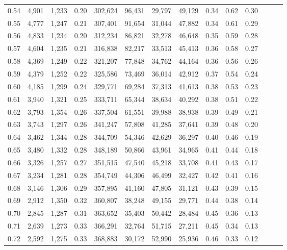 \begin{tabular}{rrrrrrrrrrrrrr}
0.54 &  4,901 &  1,233 &  0.20 &  302,624 &   96,431 &  29,797 &  49,129 &  0.34 &  0.62 &      0.30 \\
0.55 &  4,777 &  1,247 &  0.21 &  307,401 &   91,654 &  31,044 &  47,882 &  0.34 &  0.61 &      0.29 \\
0.56 &  4,833 &  1,234 &  0.20 &  312,234 &   86,821 &  32,278 &  46,648 &  0.35 &  0.59 &      0.28 \\
0.57 &  4,604 &  1,235 &  0.21 &  316,838 &   82,217 &  33,513 &  45,413 &  0.36 &  0.58 &      0.27 \\
0.58 &  4,369 &  1,249 &  0.22 &  321,207 &   77,848 &  34,762 &  44,164 &  0.36 &  0.56 &      0.26 \\
0.59 &  4,379 &  1,252 &  0.22 &  325,586 &   73,469 &  36,014 &  42,912 &  0.37 &  0.54 &      0.24 \\
0.60 &  4,185 &  1,299 &  0.24 &  329,771 &   69,284 &  37,313 &  41,613 &  0.38 &  0.53 &      0.23 \\
0.61 &  3,940 &  1,321 &  0.25 &  333,711 &   65,344 &  38,634 &  40,292 &  0.38 &  0.51 &      0.22 \\
0.62 &  3,793 &  1,354 &  0.26 &  337,504 &   61,551 &  39,988 &  38,938 &  0.39 &  0.49 &      0.21 \\
0.63 &  3,743 &  1,297 &  0.26 &  341,247 &   57,808 &  41,285 &  37,641 &  0.39 &  0.48 &      0.20 \\
0.64 &  3,462 &  1,344 &  0.28 &  344,709 &   54,346 &  42,629 &  36,297 &  0.40 &  0.46 &      0.19 \\
0.65 &  3,480 &  1,332 &  0.28 &  348,189 &   50,866 &  43,961 &  34,965 &  0.41 &  0.44 &      0.18 \\
0.66 &  3,326 &  1,257 &  0.27 &  351,515 &   47,540 &  45,218 &  33,708 &  0.41 &  0.43 &      0.17 \\
0.67 &  3,234 &  1,281 &  0.28 &  354,749 &   44,306 &  46,499 &  32,427 &  0.42 &  0.41 &      0.16 \\
0.68 &  3,146 &  1,306 &  0.29 &  357,895 &   41,160 &  47,805 &  31,121 &  0.43 &  0.39 &      0.15 \\
0.69 &  2,912 &  1,350 &  0.32 &  360,807 &   38,248 &  49,155 &  29,771 &  0.44 &  0.38 &      0.14 \\
0.70 &  2,845 &  1,287 &  0.31 &  363,652 &   35,403 &  50,442 &  28,484 &  0.45 &  0.36 &      0.13 \\
0.71 &  2,639 &  1,273 &  0.33 &  366,291 &   32,764 &  51,715 &  27,211 &  0.45 &  0.34 &      0.13 \\
0.72 &  2,592 &  1,275 &  0.33 &  368,883 &   30,172 &  52,990 &  25,936 &  0.46 &  0.33 &      0.12 \\

\end{tabular}
